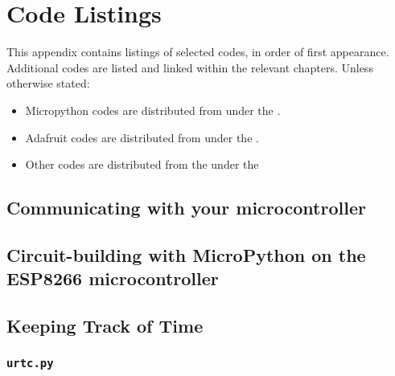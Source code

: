 \setchapterpreamble[u]{\margintoc}
\chapter{Code Listings}

This appendix contains listings of selected codes, in order of first appearance. Additional codes are listed and linked within the relevant chapters. Unless otherwise stated:
\begin{itemize}
	\item Micropython codes are distributed from  under the .
	\item Adafruit codes are distributed from  under the .
	\item Other codes are distributed from the  under the 
\end{itemize}


\section{Communicating with your microcontroller}

\section{Circuit-building with MicroPython on the ESP8266 microcontroller}


\section{Keeping Track of Time}
\subsection{\lstinline{urtc.py}}


